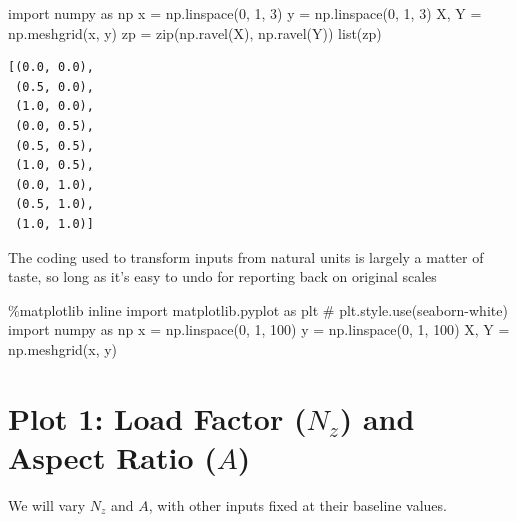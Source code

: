 \documentclass[
  letterpaper,
  DIV=11,
  numbers=noendperiod]{scrreprt}
\newenvironment{Shaded}{\begin{snugshade}}{\end{snugshade}}
\newcommand{\BuiltInTok}[1]{\textcolor[rgb]{0.00,0.23,0.31}{#1}}
\newcommand{\CommentTok}[1]{\textcolor[rgb]{0.37,0.37,0.37}{#1}}
\newcommand{\DecValTok}[1]{\textcolor[rgb]{0.68,0.00,0.00}{#1}}
\newcommand{\ImportTok}[1]{\textcolor[rgb]{0.00,0.46,0.62}{#1}}
\newcommand{\NormalTok}[1]{\textcolor[rgb]{0.00,0.23,0.31}{#1}}
\newcommand{\OperatorTok}[1]{\textcolor[rgb]{0.37,0.37,0.37}{#1}}
\begin{document}
\begin{Shaded}
\begin{Highlighting}[]
\ImportTok{import}\NormalTok{ numpy }\ImportTok{as}\NormalTok{ np}
\NormalTok{x }\OperatorTok{=}\NormalTok{ np.linspace(}\DecValTok{0}\NormalTok{, }\DecValTok{1}\NormalTok{, }\DecValTok{3}\NormalTok{)}
\NormalTok{y }\OperatorTok{=}\NormalTok{ np.linspace(}\DecValTok{0}\NormalTok{, }\DecValTok{1}\NormalTok{, }\DecValTok{3}\NormalTok{)}
\NormalTok{X, Y }\OperatorTok{=}\NormalTok{ np.meshgrid(x, y)}
\NormalTok{zp }\OperatorTok{=} \BuiltInTok{zip}\NormalTok{(np.ravel(X), np.ravel(Y))}
\BuiltInTok{list}\NormalTok{(zp)}
\end{Highlighting}
\end{Shaded}

\begin{verbatim}
[(0.0, 0.0),
 (0.5, 0.0),
 (1.0, 0.0),
 (0.0, 0.5),
 (0.5, 0.5),
 (1.0, 0.5),
 (0.0, 1.0),
 (0.5, 1.0),
 (1.0, 1.0)]
\end{verbatim}

The coding used to transform inputs from natural units is largely a
matter of taste, so long as it's easy to undo for reporting back on
original scales

\begin{Shaded}
\begin{Highlighting}[]
\OperatorTok{\%}\NormalTok{matplotlib inline}
\ImportTok{import}\NormalTok{ matplotlib.pyplot }\ImportTok{as}\NormalTok{ plt}
\CommentTok{\# plt.style.use(\textquotesingle{}seaborn{-}white\textquotesingle{})}
\ImportTok{import}\NormalTok{ numpy }\ImportTok{as}\NormalTok{ np}
\NormalTok{x }\OperatorTok{=}\NormalTok{ np.linspace(}\DecValTok{0}\NormalTok{, }\DecValTok{1}\NormalTok{, }\DecValTok{100}\NormalTok{)}
\NormalTok{y }\OperatorTok{=}\NormalTok{ np.linspace(}\DecValTok{0}\NormalTok{, }\DecValTok{1}\NormalTok{, }\DecValTok{100}\NormalTok{)}
\NormalTok{X, Y }\OperatorTok{=}\NormalTok{ np.meshgrid(x, y)}
\end{Highlighting}
\end{Shaded}

\section{\texorpdfstring{Plot 1: Load Factor (\(N_z\)) and Aspect Ratio
(\(A\))}{Plot 1: Load Factor (N\_z) and Aspect Ratio (A)}}\label{plot-1-load-factor-n_z-and-aspect-ratio-a}

We will vary \(N_z\) and \(A\), with other inputs fixed at their
baseline values.
\end{document}
